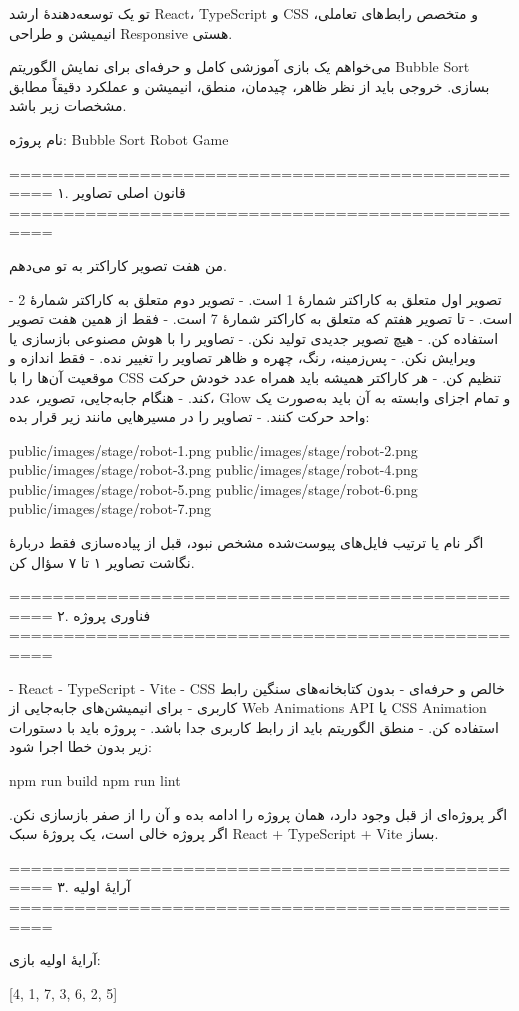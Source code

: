 تو یک توسعه‌دهندهٔ ارشد React، TypeScript و CSS و متخصص رابط‌های تعاملی، انیمیشن و طراحی Responsive هستی.

می‌خواهم یک بازی آموزشی کامل و حرفه‌ای برای نمایش الگوریتم Bubble Sort بسازی. خروجی باید از نظر ظاهر، چیدمان، منطق، انیمیشن و عملکرد دقیقاً مطابق مشخصات زیر باشد.

نام پروژه:
Bubble Sort Robot Game

==================================================
۱. قانون اصلی تصاویر
==================================================

من هفت تصویر کاراکتر به تو می‌دهم.

- تصویر اول متعلق به کاراکتر شمارهٔ 1 است.
- تصویر دوم متعلق به کاراکتر شمارهٔ 2 است.
- تا تصویر هفتم که متعلق به کاراکتر شمارهٔ 7 است.
- فقط از همین هفت تصویر استفاده کن.
- هیچ تصویر جدیدی تولید نکن.
- تصاویر را با هوش مصنوعی بازسازی یا ویرایش نکن.
- پس‌زمینه، رنگ، چهره و ظاهر تصاویر را تغییر نده.
- فقط اندازه و موقعیت آن‌ها را با CSS تنظیم کن.
- هر کاراکتر همیشه باید همراه عدد خودش حرکت کند.
- هنگام جابه‌جایی، تصویر، عدد، Glow و تمام اجزای وابسته به آن باید به‌صورت یک واحد حرکت کنند.
- تصاویر را در مسیرهایی مانند زیر قرار بده:

public/images/stage/robot-1.png
public/images/stage/robot-2.png
public/images/stage/robot-3.png
public/images/stage/robot-4.png
public/images/stage/robot-5.png
public/images/stage/robot-6.png
public/images/stage/robot-7.png

اگر نام یا ترتیب فایل‌های پیوست‌شده مشخص نبود، قبل از پیاده‌سازی فقط دربارهٔ نگاشت تصاویر ۱ تا ۷ سؤال کن.

==================================================
۲. فناوری پروژه
==================================================

- React
- TypeScript
- Vite
- CSS خالص و حرفه‌ای
- بدون کتابخانه‌های سنگین رابط کاربری
- برای انیمیشن‌های جابه‌جایی از Web Animations API یا CSS Animation استفاده کن.
- منطق الگوریتم باید از رابط کاربری جدا باشد.
- پروژه باید با دستورات زیر بدون خطا اجرا شود:

npm run build
npm run lint

اگر پروژه‌ای از قبل وجود دارد، همان پروژه را ادامه بده و آن را از صفر بازسازی نکن. اگر پروژه خالی است، یک پروژهٔ سبک React + TypeScript + Vite بساز.

==================================================
۳. آرایهٔ اولیه
==================================================

آرایهٔ اولیه بازی:

[4, 1, 7, 3, 6, 2, 5]

